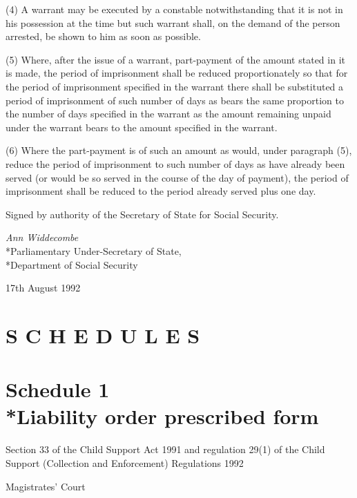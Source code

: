\documentclass[12pt,a4paper]{article}
\begin{document}
(4) A warrant may be executed by a constable notwithstanding that it is not in his possession at the time but such warrant shall, on the demand of the person arrested, be shown to him as soon as possible.

(5) Where, after the issue of a warrant, part-payment of the amount stated in it is made, the period of imprisonment shall be reduced proportionately so that for the period of imprisonment specified in the warrant there shall be substituted a period of imprisonment of such number of days as bears the same proportion to the number of days specified in the warrant as the amount remaining unpaid under the warrant bears to the amount specified in the warrant.

(6) Where the part-payment is of such an amount as would, under paragraph (5), reduce the period of imprisonment to such number of days as have already been served (or would be so served in the course of the day of payment), the period of imprisonment shall be reduced to the period already served plus one day.

\bigskip

Signed by authority of the Secretary of State for Social Security.

{\raggedleft
\emph{Ann Widdecombe}\\*Parliamentary Under-Secretary of State,\\*Department of Social Security

}

17th August 1992

\small

\part*{S C H E D U L E S}

\part[Schedule 1 --- Liability order prescribed form]{Schedule 1\\*Liability order prescribed form}

\renewcommand\parthead{--- Schedule 1}

\noindent
Section 33 of the Child Support Act 1991 and regulation 29(1) of the Child Support (Collection and Enforcement) Regulations 1992

\medskip

{\raggedleft \hspace{0.5\linewidth}\dotfill Magistrates' Court

}
\end{document}
